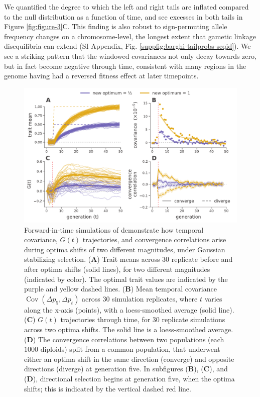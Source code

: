 \documentclass[9pt,twocolumn,twoside]{pnas-new}
\DeclareMathOperator{\cov}{Cov}
\begin{document}
We quantified the degree to which the left and
right tails are inflated compared to the null distribution as a function of
time, and see excesses in both tails in Figure \ref{fig:figure-3}C. This
finding is also robust to sign-permuting allele frequency changes on a
chromosome-level, the longest extent that gametic linkage disequilibria can
extend (SI Appendix, Fig. \ref{suppfig:barghi-tailprobs-seqid}). We see a
striking pattern that the windowed covariances not only decay towards zero, but
in fact become negative through time, consistent with many regions in the
genome having had a reversed fitness effect at later timepoints.

\begin{figure}
  \centering
  \includegraphics[width=15cm]{figure-4.pdf}

  \caption{Forward-in-time simulations of demonstrate how temporal covariance,
    $G(t)$ trajectories, and convergence correlations arise during optima
    shifts of two different magnitudes, under Gaussian stabilizing selection.
    ({\bf A}) Trait means across 30 replicate before and after optima shifts (solid
    lines), for two different magnitudes (indicated by color). The optimal
    trait values are indicated by the purple and yellow dashed lines.  ({\bf B}) Mean
    temporal covariance $\cov(\Delta p_5, \Delta p_t)$ across 30 simulation
    replicates, where $t$ varies along the x-axis (points), with a
    loess-smoothed average (solid line). ({\bf C}) $G(t)$ trajectories through time,
    for 30 replicate simulations across two optima shifts. The solid line is a
    loess-smoothed average. ({\bf D}) The convergence correlations between two
    populations (each $1000$ diploids) split from a common population, that
    underwent either an optima shift in the same direction (converge) and
    opposite directions (diverge) at generation five. In subfigures ({\bf B}), ({\bf C}),
    and ({\bf D}), directional selection begins at generation five, when the optima
    shifts; this is indicated by the vertical dashed red line.}

  \label{fig:figure-4}
\end{figure}
\end{document}
